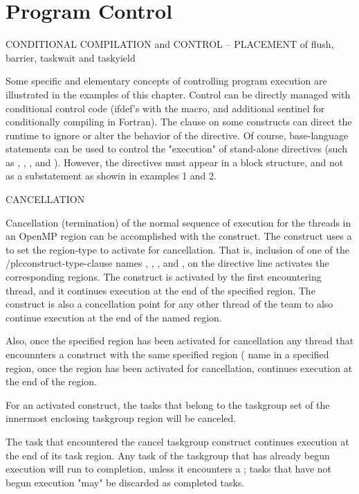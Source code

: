 \pagebreak
\chapter{Program Control}
\label{sec:program_control}

CONDITIONAL COMPILATION and CONTROL   -- PLACEMENT of flush, barrier, taskwait and taskyield

Some specific and elementary concepts of controlling program execution are
illustrated in the examples of this chapter.  Control can be directly
managed with conditional control code (ifdef's with the  macro, and additional sentinel 
for conditionally compiling in Fortran). The  clause on some constructs
can direct the runtime to ignore or alter the behavior of the directive.
Of course, base-language  statements can be used to control the "execution" 
of stand-alone directives (such as , , , and  ).
However, the directives must appear in a block structure, and not as a substatement as showin in examples 1 and 2.


CANCELLATION

Cancellation (termination) of the normal sequence of execution for the threads in an OpenMP region can
be  accomplished with the  construct.  The construct uses a
 to set the region-type to activate for cancellation. 
That is, inclusion  of one of the /plc{construct-type-clause} names , , 
,  and , on the directive line activates the corresponding regions.  
The  construct is activated by the first encountering thread,  and it
continues execution at the end of the specified region.
The  construct is also a concellation point for any other thread of the team 
to also continue execution at the end of the named region.  

Also, once the specified region has been activated for cancellation any thread that encounnters 
a  construct with the same specified region ( name
in a specified
region, once the region has been activated for cancellation, continues execution at the end of the region.

For an activated  construct, the tasks that
belong to the taskgroup set of the innermost enclosing taskgroup region will be canceled. 

The task that encountered the cancel taskgroup construct continues execution at the end of its
task region. Any task of the taskgroup that has already begun execution will run to completion,
unless it encounters a ; tasks that have not begun execution "may" be
discarded as completed tasks.

